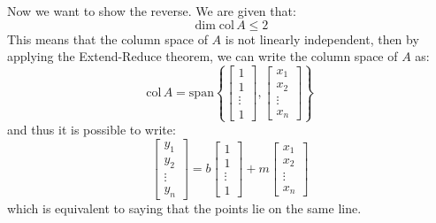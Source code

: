 \documentclass{article}
\newcommand{\spann}[1]{\mathrm{span}\left\{#1\right\}}
\newcommand{\col}[1]{\mathrm{col\,} #1}
\begin{document}
Now we want to show the reverse. We are given that:
\begin{equation}
    \dim\col A \le 2
\end{equation}
This means that the column space of $A$ is not linearly independent, then by applying the Extend-Reduce theorem, we can write the column space of $A$ as:
\begin{equation}
    \col A = \spann{\begin{bmatrix}
        1\\1\\ \vdots \\ 1
    \end{bmatrix}, \begin{bmatrix}
        x_1\\x_2\\\vdots \\ x_n
    \end{bmatrix}}
\end{equation}
and thus it is possible to write:
\begin{equation}
    \begin{bmatrix}
        y_1\\y_2\\\vdots \\ y_n
    \end{bmatrix} = b\begin{bmatrix}
        1\\1\\ \vdots \\ 1
    \end{bmatrix} + m\begin{bmatrix}
        x_1\\x_2\\\vdots \\ x_n
    \end{bmatrix}
\end{equation}
which is equivalent to saying that the points lie on the same line.
\end{document}
